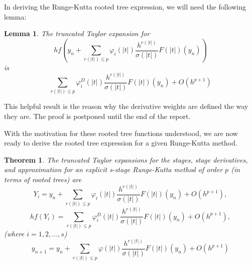 \documentclass[12pt]{amsart}
\newtheorem*{theorem}{Theorem}
\newtheorem*{lemma}{Lemma}
\theoremstyle{definition}
\begin{document}
  In deriving the Runge-Kutta rooted tree expression, we will need the following lemma:
  \begin{lemma}
	The truncated Taylor expansion for
	$$hf\left(y_n + \sum_{r(|t|) \le p}{\varphi_i(|t|)\frac{h^{r(|t|)}}{\sigma(|t|)}F(|t|)(y_n) }\right)$$
	is
	$$\sum_{r(|t|) \le p}{\varphi_i^D(|t|)\frac{h^{r(|t|)}}{\sigma(|t|)}F(|t|)(y_n)} + O(h^{p + 1})$$
  \end{lemma}
  This helpful result is the reason why the derivative weights are defined the way they are.
  The proof is postponed until the end of the report.

  With the motivation for these rooted tree functions understood, we are now ready to derive the rooted
  tree expression for a given Runge-Kutta method.

  \begin{theorem}
	The truncated Taylor expansions for the stages, stage derivatives, and approximation 
	for an explicit s-stage Runge-Kutta method of order $p$ (in terms of rooted trees) are 
	$$Y_i = y_n + \sum_{r(|t|) \le p}\varphi_i(|t|) {\frac{h^{r(|t|)}}{\sigma(|t|)}F(|t|)(y_n)} + O(h^{p + 1}),$$
	$$hf(Y_i) = \sum_{r(|t|) \le p}{\varphi_i^D(|t|)\frac{h^{r(|t|)}}{\sigma(|t|)}F(|t|)(y_n) } + O(h^{p + 1}),$$
	\hfill (where $i = 1, 2, \dots, s$)
	$$y_{n + 1} =  y_n + \sum_{r(|t|) \le p}{\varphi(|t|)\frac{h^{r(|t|)}}{\sigma(|t|)}F(|t|)(y_n)} + O(h^{p + 1})$$
  \end{theorem}
\end{document}

